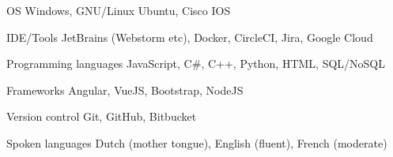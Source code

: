 
\begin{cvskills}

    \cvskill
        {OS} %
        {Windows, GNU/Linux Ubuntu, Cisco IOS} %
    
    \cvskill
        {IDE/Tools} %
        {JetBrains (Webstorm etc), Docker, CircleCI, Jira, Google Cloud} %
    
    \cvskill
        {Programming languages} %
        {JavaScript, C\#, C++, Python, HTML, SQL/NoSQL} %

    \cvskill
        {Frameworks} %
        {Angular, VueJS, Bootstrap, NodeJS} %
    
    \cvskill
        {Version control} %
        {Git, GitHub, Bitbucket} %
    
    \cvskill
        {Spoken languages} %
        {Dutch (mother tongue), English (fluent), French (moderate)} %
    
\end{cvskills}
